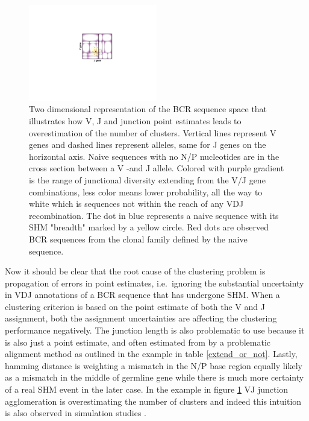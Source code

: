 \begin{figure}[ht]
    \centering
    \includegraphics[width=0.5\textwidth]{figures/VJ_CDR3_agglomeration.pdf}
    \caption{
        \label{fig:VJ_CDR3_agglomeration}
        Two dimensional representation of the BCR sequence space that illustrates how V, J and junction point estimates leads to overestimation of the number of clusters.
        Vertical lines represent V genes and dashed lines represent alleles, same for J genes on the horizontal axis.
        Naive sequences with no N/P nucleotides are in the cross section between a V -and J allele.
        Colored with purple gradient is the range of junctional diversity extending from the V/J gene combinations, less color means lower probability, all the way to white which is sequences not within the reach of any VDJ recombination.
        The dot in blue represents a naive sequence with its SHM "breadth" marked by a yellow circle.
        Red dots are observed BCR sequences from the clonal family defined by the naive sequence.
    }
\end{figure}


Now it should be clear that the root cause of the clustering problem is propagation of errors in point estimates, i.e.\ ignoring the substantial uncertainty in VDJ annotations of a BCR sequence that has undergone SHM.
When a clustering criterion is based on the point estimate of both the V and J assignment, both the assignment uncertainties are affecting the clustering performance negatively.
The junction length is also problematic to use because it is also just a point estimate, and often estimated from by a problematic alignment method as outlined in the example in table \ref{extend_or_not}.
Lastly, hamming distance is weighting a mismatch in the N/P base region equally likely as a mismatch in the middle of germline gene while there is much more certainty of a real SHM event in the later case.
In the example in figure \ref{fig:VJ_CDR3_agglomeration} VJ junction agglomeration is overestimating the number of clusters and indeed this intuition is also observed in simulation studies \cite{ralph2016likelihood}.

